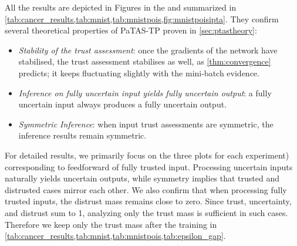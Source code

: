 All the results are depicted in Figures in the \appp and summarized in \cref{tab:cancer_results,tab:mnist,tab:mnistpois,fig:mnistpoisipta}. They confirm several theoretical properties of \ac{PaTAS-TP} proven in \cref{sec:ptastheory}:



\begin{itemize}
\item \emph{Stability of the trust assessment}: once the gradients of the network have stabilised, the trust assessment stabilises as well, as \cref{thm:convergence} predicts; it keeps fluctuating slightly with the mini-batch evidence.
\item \emph{Inference on fully uncertain input yields fully uncertain output}: a fully uncertain input always produces a fully uncertain output.
\item \emph{Symmetric Inference}: when input trust assessments are symmetric, the inference results remain symmetric.
\end{itemize}

For detailed results, we primarily focus on the three plots for each experiment) corresponding to feedforward of fully trusted input. Processing uncertain inputs naturally yields uncertain outputs, while symmetry implies that trusted and distrusted cases mirror each other. We also confirm that when processing fully trusted inputs, the distrust mass remains close to zero. Since trust, uncertainty, and distrust sum to 1, analyzing only the trust mass is sufficient in such cases. Therefore we keep only the trust mass after the training in \cref{tab:cancer_results,tab:mnist,tab:mnistpois,tab:epsilon_gap}. 

